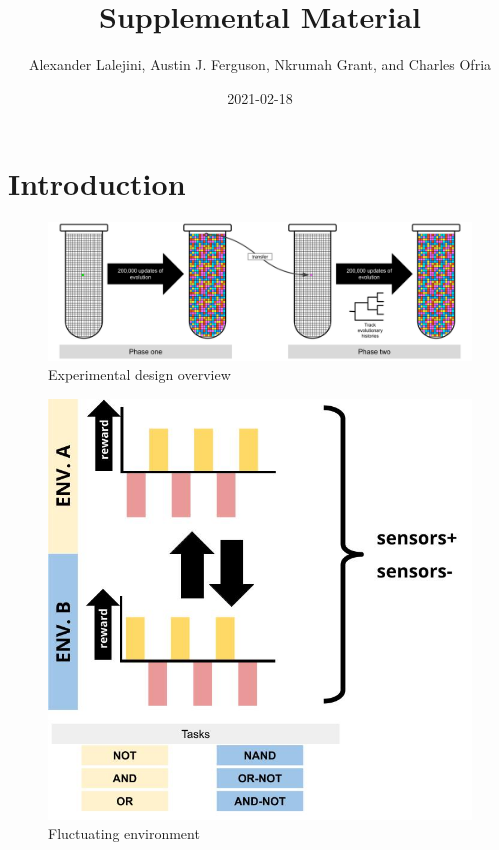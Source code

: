\documentclass[]{book}
\title{Supplemental Material}
\author{Alexander Lalejini, Austin J. Ferguson, Nkrumah Grant, and Charles Ofria}
\date{2021-02-18}
\begin{document}
\maketitle

{
\setcounter{tocdepth}{1}
\tableofcontents
}
\hypertarget{introduction}{%
\chapter{Introduction}\label{introduction}}

\begin{figure}
\centering
\includegraphics{media/experimental-design-overview.png}
\caption{Experimental design overview}
\end{figure}

\begin{figure}
\centering
\includegraphics{media/fluctuating-environment.jpg}
\caption{Fluctuating environment}
\end{figure}
\end{document}

